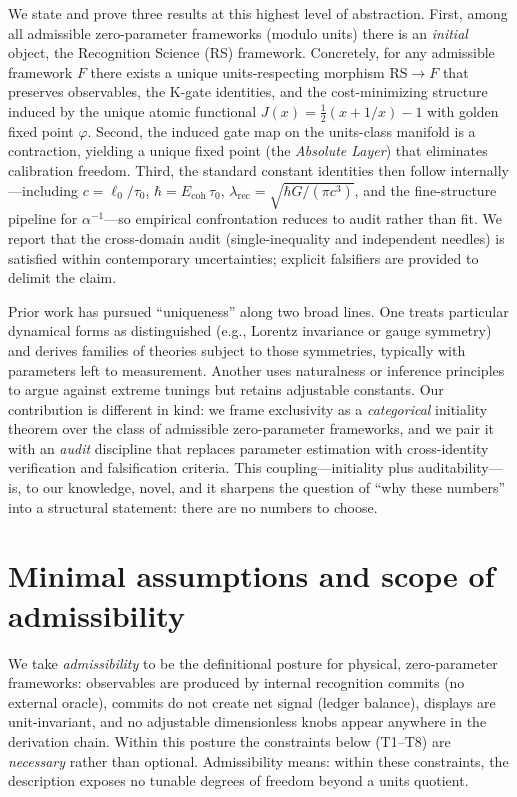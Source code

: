 \documentclass[11pt]{article}
\begin{document}
We state and prove three results at this highest level of abstraction. First, among all admissible zero\mbox{-}parameter frameworks (modulo units) there is an \emph{initial} object, the Recognition Science (RS) framework. Concretely, for any admissible framework \(F\) there exists a unique units\mbox{-}respecting morphism \(\mathrm{RS}\to F\) that preserves observables, the K\mbox{-}gate identities, and the cost\mbox{-}minimizing structure induced by the unique atomic functional \(J(x)=\tfrac{1}{2}(x+1/x)-1\) with golden fixed point \(\varphi\). Second, the induced gate map on the units\mbox{-}class manifold is a contraction, yielding a unique fixed point (the \emph{Absolute Layer}) that eliminates calibration freedom. Third, the standard constant identities then follow internally---including \(c=\ell_0/\tau_0\), \(\hbar=E_{\mathrm{coh}}\,\tau_0\), \(\lambda_{\mathrm{rec}}=\sqrt{\hbar G/(\pi c^3)}\), and the fine\mbox{-}structure pipeline for \(\alpha^{-1}\)---so empirical confrontation reduces to audit rather than fit. We report that the cross\mbox{-}domain audit (single\mbox{-}inequality and independent needles) is satisfied within contemporary uncertainties; explicit falsifiers are provided to delimit the claim.

Prior work has pursued ``uniqueness'' along two broad lines. One treats particular dynamical forms as distinguished (e.g., Lorentz invariance or gauge symmetry) and derives families of theories subject to those symmetries, typically with parameters left to measurement. Another uses naturalness or inference principles to argue against extreme tunings but retains adjustable constants. Our contribution is different in kind: we frame exclusivity as a \emph{categorical} initiality theorem over the class of admissible zero\mbox{-}parameter frameworks, and we pair it with an \emph{audit} discipline that replaces parameter estimation with cross\mbox{-}identity verification and falsification criteria. This coupling---initiality plus auditability---is, to our knowledge, novel, and it sharpens the question of ``why these numbers'' into a structural statement: there are no numbers to choose.

\section{Minimal assumptions and scope of admissibility}
We take \emph{admissibility} to be the definitional posture for physical, zero\mbox{-}parameter frameworks: observables are produced by internal recognition commits (no external oracle), commits do not create net signal (ledger balance), displays are unit\mbox{-}invariant, and no adjustable dimensionless knobs appear anywhere in the derivation chain. Within this posture the constraints below (T1--T8) are \emph{necessary} rather than optional. Admissibility means: within these constraints, the description exposes no tunable degrees of freedom beyond a units quotient.
\end{document}
